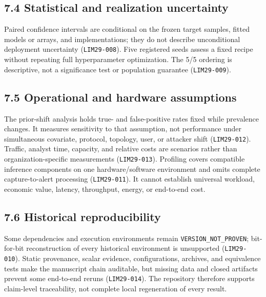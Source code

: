 \documentclass[preprint,12pt]{elsarticle}
\begin{document}
\subsection{7.4 Statistical and realization uncertainty}
Paired confidence intervals are conditional on the frozen target samples, fitted models or arrays, and implementations; they do not describe unconditional deployment uncertainty (\texttt{LIM29-008}). Five registered seeds assess a fixed recipe without repeating full hyperparameter optimization. The 5/5 ordering is descriptive, not a significance test or population guarantee (\texttt{LIM29-009}).

\subsection{7.5 Operational and hardware assumptions}
The prior-shift analysis holds true- and false-positive rates fixed while prevalence changes. It measures sensitivity to that assumption, not performance under simultaneous covariate, protocol, topology, user, or attacker shift (\texttt{LIM29-012}). Traffic, analyst time, capacity, and relative costs are scenarios rather than organization-specific measurements (\texttt{LIM29-013}). Profiling covers compatible inference components on one hardware/software environment and omits complete capture-to-alert processing (\texttt{LIM29-011}). It cannot establish universal workload, economic value, latency, throughput, energy, or end-to-end cost.

\subsection{7.6 Historical reproducibility}
Some dependencies and execution environments remain\linebreak{} \texttt{VERSION\_NOT\_PROVEN}; bit-for-bit reconstruction of every historical environment is unsupported\linebreak{} (\texttt{LIM29-010}). Static provenance, scalar evidence, configurations, archives, and equivalence tests make the manuscript chain auditable, but missing data and closed artifacts prevent some end-to-end reruns (\texttt{LIM29-014}). The repository therefore supports claim-level traceability, not complete local regeneration of every result.
\end{document}
